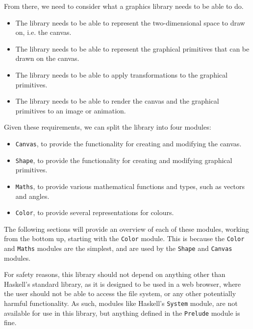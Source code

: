 \documentclass[../main.tex]{subfiles}
\begin{document}
            From there, we need to consider what a graphics library needs to be able to do.
            \begin{itemize}
                \item The library needs to be able to represent the two-dimensional space
                      to draw on, i.e. the canvas.
                \item The library needs to be able to represent the graphical primitives
                      that can be drawn on the canvas.
                \item The library needs to be able to apply transformations to the graphical
                      primitives.
                \item The library needs to be able to render the canvas and the graphical
                      primitives to an image or animation.
            \end{itemize}
            Given these requirements, we can split the library into four modules:
            \begin{itemize}
                \item \verb|Canvas|, to provide the functionality for creating and modifying
                      the canvas.
                \item \verb|Shape|, to provide the functionality for creating and modifying
                      graphical primitives.
                \item \verb|Maths|, to provide various mathematical functions and types, such
                      as vectors and angles.
                \item \verb|Color|, to provide several representations for colours.
            \end{itemize}
            The following sections will provide an overview of each of these modules,
                working from the bottom up, starting with the \verb|Color| module.
            This is because the \verb|Color| and \verb|Maths| modules are the simplest, and
                are used by the \verb|Shape| and \verb|Canvas| modules.

            For safety reasons, this library should not depend on anything other than
                Haskell's standard library, as it is designed to be used in a web browser,
                where the user should not be able to access the file system, or any other
                potentially harmful functionality.
            As such, modules like Haskell's \verb|System| module, are not available for use
                in this library, but anything defined in the \verb|Prelude| module is fine.
\end{document}
